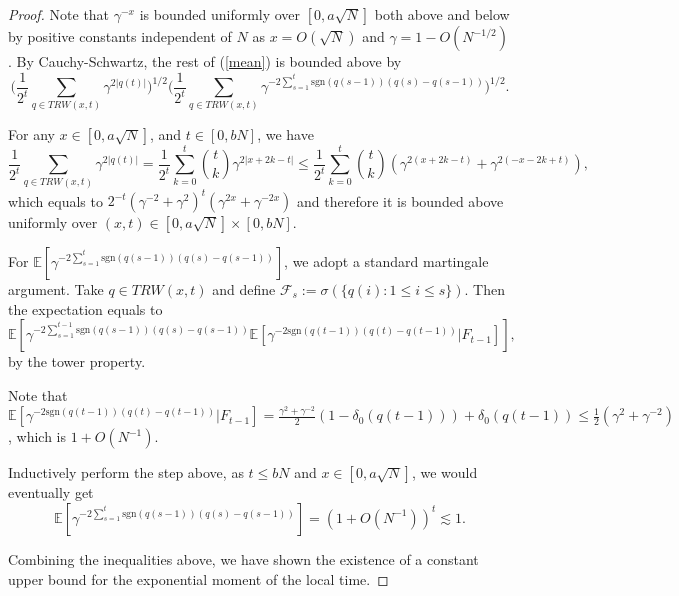 \documentclass[10pt]{article}
\begin{document}
\begin{proof}
Note that $\gamma^{-x}$ is bounded uniformly over $[0, a\sqrt{N}]$ both above and below by positive constants independent of $N$ as $x=O(\sqrt{N})$ and $\gamma =1-O(N^{-1/2})$. By Cauchy-Schwartz, the rest of (\ref{mean}) is bounded above by 
\begin{equation}
    \Big(\frac{1}{2^{t}}\sum_{q \in TRW(x,t)} \gamma^{2|q(t)|}\Big)^{1/2}\Big(\frac{1}{2^{t}}\sum_{q \in TRW(x,t)} \gamma^{-2\sum_{s=1}^t \text{sgn}(q(s-1))(q(s)-q(s-1))}\Big)^{1/2}.
\end{equation}

For any $x \in [0, a\sqrt{N}]$, and $t \in [0, bN]$, we have
\begin{equation}
        \frac{1}{2^{t}}\sum_{q \in TRW(x,t)} \gamma^{2|q(t)|} =\frac{1}{2^t} \sum_{k=0}^t {{t} \choose {k}} \gamma^{2|x+2k-t|} \leq \frac{1}{2^t} \sum_{k=0}^t {{t} \choose {k}} \left(\gamma^{2(x+2k-t)}+\gamma^{2(-x-2k+t)}\right),
\end{equation}
which equals to $2^{-t}\left(\gamma^{-2}+\gamma^2\right)^t\left(\gamma^{2x}+\gamma^{-2x}\right)$ and therefore it is bounded above uniformly over $(x, t) \in [0, a\sqrt{N}] \times [0, bN]$.

For $\mathbb{E}[\gamma^{-2\sum_{s=1}^t \text{sgn}(q(s-1))(q(s)-q(s-1))}]$, we adopt a standard martingale argument. Take $q \in TRW(x,t)$ and define $\mathcal{F}_s:=\sigma(\{q(i): 1 \leq i \leq s\})$. Then the expectation equals to
\begin{equation}
    \mathbb{E}[\gamma^{-2\sum_{s=1}^{t-1} \text{sgn}(q(s-1))(q(s)-q(s-1))} \mathbb{E}[\gamma^{-2\text{sgn}(q(t-1))(q(t)-q(t-1))}|F_{t-1}]],
\end{equation}
by the tower property.

Note that $\mathbb{E}[\gamma^{-2\text{sgn}(q(t-1))(q(t)-q(t-1))}|F_{t-1}]=\frac{\gamma^2+\gamma^{-2}}{2}(1-\delta_0(q(t-1)))+\delta_0(q(t-1)) \leq \frac{1}{2}\left(\gamma^2+\gamma^{-2}\right)$, which is $1+O(N^{-1})$.

Inductively perform the step above, as $t \leq bN$ and $x \in [0, a\sqrt{N}]$, we would eventually get 
\begin{equation}
    \mathbb{E}\left[\gamma^{-2\sum_{s=1}^t \text{sgn}(q(s-1))(q(s)-q(s-1))}\right] =(1+O(N^{-1}))^t \lesssim 1.
\end{equation}
    

Combining the inequalities above, we have shown the existence of a constant upper bound for the exponential moment of the local time.

\end{proof}
\end{document}
